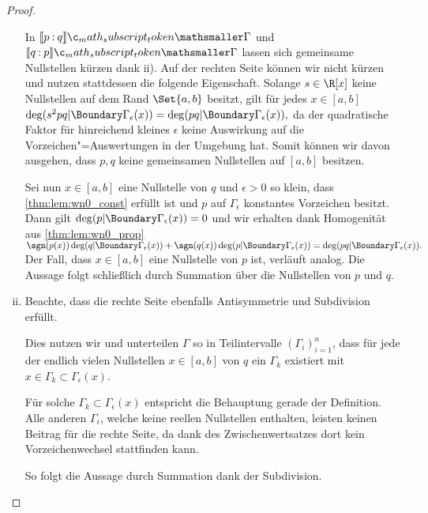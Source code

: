 \documentclass{mythesis}
\begin{document}
\begin{proposition}
\begin{proof}
\begin{enumerate}[i),start=2]
                In $\Index{\Gamma}{p}{q}$ und $\Index{\Gamma}{q}{p}$ lassen sich gemeinsame Nullstellen kürzen dank ii).
                Auf der rechten Seite können wir nicht kürzen und nutzen stattdessen die folgende Eigenschaft.
                Solange $s \in \R[x]$ keine Nullstellen auf dem Rand $\Set{a,b}$ besitzt, gilt für jedes $x \in [a,b]$
                \begin{math}
                    \deg(s^2 pq|\Boundary\Gamma_\epsilon(x)) = \deg(pq|\Boundary\Gamma_\epsilon(x)),
                \end{math}
                da der quadratische Faktor für hinreichend kleines $\epsilon$ keine Auswirkung auf die Vorzeichen"=Auswertungen in der Umgebung hat.
                Somit können wir davon ausgehen, dass $p, q$ keine gemeinsamen Nullstellen auf $[a,b]$ besitzen.

                Sei nun $x \in [a,b]$ eine Nullstelle von $q$ und $\epsilon > 0$ so klein, dass \ref{thm:lem:wn0_const} erfüllt ist und $p$ auf $\Gamma_\epsilon$ konstantes Vorzeichen besitzt.
                Dann gilt $\deg(p|\Boundary\Gamma_\epsilon(x)) = 0$ und wir erhalten dank Homogenität aus \ref{thm:lem:wn0_prop}
                \begin{math}
                    \sgn(p(x)) \deg(q|\Boundary\Gamma_\epsilon(x))
                    + \sgn(q(x)) \deg(p|\Boundary\Gamma_\epsilon(x))
                    = \deg(pq|\Boundary\Gamma_\epsilon(x)).
                \end{math}
                Der Fall, dass $x \in [a,b]$ eine Nullstelle von $p$ ist, verläuft analog.
                Die Aussage folgt schließlich durch Summation über die Nullstellen von $p$ und $q$.
            \item
                Beachte, dass die rechte Seite ebenfalls Antisymmetrie und Subdivision erfüllt.

                Dies nutzen wir und unterteilen $\Gamma$ so in Teilintervalle $(\Gamma_i)_{i=1}^n$, dass für jede der endlich vielen Nullstellen $x \in [a,b]$ von $q$ ein $\Gamma_k$ existiert mit $x \in \Gamma_k \subset \Gamma_\epsilon(x)$.

                Für solche $\Gamma_k \subset \Gamma_\epsilon(x)$ entspricht die Behauptung gerade der Definition.
                Alle anderen $\Gamma_i$, welche keine reellen Nullstellen enthalten, leisten keinen Beitrag für die rechte Seite, da dank des Zwischenwertsatzes dort kein Vorzeichenwechsel stattfinden kann.

                So folgt die Aussage durch Summation dank der Subdivision.
        \end{enumerate}
    \end{proof}
\end{proposition}
\end{document}
